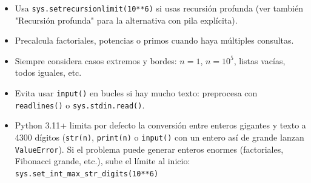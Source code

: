 \begin{itemize}
  \item Usa \texttt{sys.setrecursionlimit(10**6)} si usas recursión profunda (ver también "Recursión profunda" para la alternativa con pila explícita).
  \item Precalcula factoriales, potencias o primos cuando haya múltiples consultas.
  \item Siempre considera casos extremos y bordes: \( n = 1 \), \( n = 10^5 \), listas vacías, todos iguales, etc.
  \item Evita usar \texttt{input()} en bucles si hay mucho texto: preprocesa con \texttt{readlines()} o \texttt{sys.stdin.read()}.
  \item Python 3.11+ limita por defecto la conversión entre enteros gigantes y texto a 4300 dígitos (\texttt{str(n)}, \texttt{print(n)} o \texttt{input()} con un entero así de grande lanzan \texttt{ValueError}). Si el problema puede generar enteros enormes (factoriales, Fibonacci grande, etc.), sube el límite al inicio:\\
  \texttt{sys.set\_int\_max\_str\_digits(10**6)}
\end{itemize}
